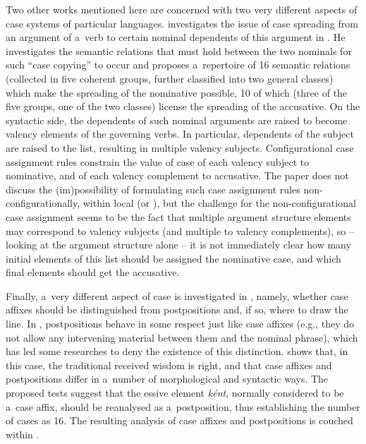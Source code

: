 \documentclass[output=paper
	        ,collection
	        ,collectionchapter
 	        ,biblatex
                ,babelshorthands
                ,newtxmath
                ,draftmode
                ,colorlinks, citecolor=brown
]{langscibook}
\begin{document}
\begin{exe}
\begin{xlist}
\begin{exe}
\begin{xlist}
Two other works mentioned here are concerned with two very different aspects of case systems of particular languages.  \citet{ryu:13} investigates the issue of case spreading from an argument of a~verb to certain nominal dependents of this argument in .  He investigates the semantic relations that must hold between the two nominals for such “case copying” to occur and proposes a~repertoire of 16 semantic relations (collected in five coherent groups, further classified into two general classes) which make the spreading of the nominative possible, 10 of which (three of the five groups, one of the two classes) license the spreading of the accusative.  On the syntactic side, the dependents of such nominal arguments are raised to become valency elements of the governing verbs.  In particular, dependents of the subject are raised to the  list, resulting in multiple valency subjects.  Configurational case assignment rules constrain the value of case of each valency subject to nominative, and of each valency complement to accusative.  The paper does not discuss the (im)possibility of formulating such case assignment rules non-configurationally, within local  (or ), but the challenge for the non-configurational case assignment seems to be the fact that multiple argument structure elements may correspond to valency subjects (and multiple to valency complements), so – looking at the argument structure alone – it is not immediately clear how many initial elements of this list should be assigned the nominative case, and which final elements should get the accusative.

Finally, a~very different aspect of  case is investigated in \citet{thui:11}, namely, whether case affixes should be distinguished from postpositions and, if so, where to draw the line.  In , postpositions behave in some respect just like case affixes (e.g., they do not allow any intervening material between them and the nominal phrase), which has led some researches to deny the existence of this distinction.  \citet{thui:11} shows that, in this case, the traditional received wisdom is right, and that case affixes and postpositions differ in a~number of morphological and syntactic ways.  The proposed tests suggest that the essive element \emph{k{\'e}nt}, normally considered to be a~case affix, should be reanalysed as a~postposition, thus establishing the number of  cases as 16.  The resulting analysis of  case affixes and postpositions is couched within  \citep{BS2012a-ed}.


\end{xlist}
\end{exe}
\end{xlist}
\end{exe}
\end{document}
